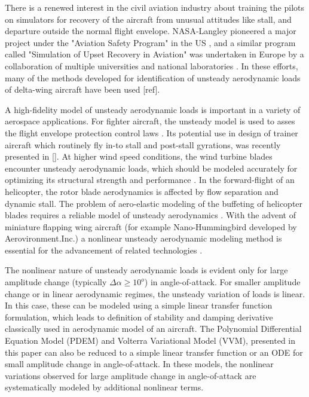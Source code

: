\documentclass{AIAA}
\begin{document}
There is a renewed interest in the civil aviation industry about training the pilots on simulators for recovery of the aircraft from unusual attitudes like stall, and departure outside the normal flight envelope. NASA-Langley pioneered a major project under the "Aviation Safety Program" in the US \cite{upset}, and a similar program called "Simulation of Upset Recovery in Aviation" was undertaken in Europe by a collaboration of multiple universities and national laboratories \cite{SUPRAGoman,SUPRAICAS}. In these efforts, many of the methods developed for identification of unsteady aerodynamic loads of delta-wing aircraft have been used [ref].

A high-fidelity model of unsteady aerodynamic loads is important in a variety of aerospace applications. For fighter aircraft, the unsteady model is used to asses the flight envelope protection control laws \cite{F18derivatives}. Its potential use in design of trainer aircraft which routinely fly in-to stall and post-stall gyrations, was recently presented in []. At higher wind speed conditions, the wind turbine blades encounter unsteady aerodynamic loads, which should be modeled accurately for optimizing its structural strength and performance \cite{Turbine1}. In the forward-flight of an helicopter, the rotor blade aerodynamics is affected by flow separation and dynamic stall. The problem of aero-elastic modeling of the buffeting of helicopter blades requires a reliable model of unsteady aerodynamics \cite{Helicopter1}.  With the advent of miniature flapping wing aircraft (for example Nano-Hummingbird developed by Aerovironment.Inc.) a nonlinear unsteady aerodynamic modeling method is essential for the advancement of related technologies \cite{FlapWing}.

The nonlinear nature of unsteady aerodynamic loads is evident only for large amplitude change (typically $\Delta \alpha \geq 10^o$) in angle-of-attack. For smaller amplitude change or in linear aerodynamic regimes, the unsteady variation of loads is linear. In this case, these can be modeled using a simple linear transfer function formulation, which leads to definition of stability and damping derivative classically used in aerodynamic model of an aircraft. The Polynomial Differential Equation Model (PDEM) and Volterra Variational Model (VVM), presented in this paper can also be reduced to a simple linear transfer function or an ODE for small amplitude change in angle-of-attack. In these models, the nonlinear variations observed for large amplitude change in angle-of-attack are systematically modeled by additional nonlinear terms.
\end{document}
